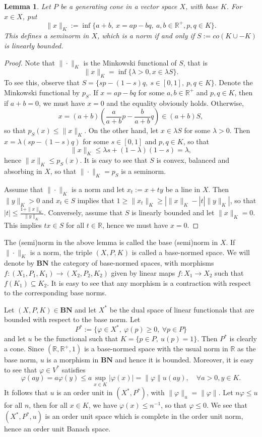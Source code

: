\documentclass[12pt]{article}
\newtheorem{lemma}{Lemma}
\newcommand{\<}{\langle}
\newcommand{\ct}[1]{\mathbf{#1}}
\begin{document}
\begin{lemma} Let $P$ be a  generating cone in a vector space $X$, with base $K$. For $x\in X$, put 
\[
\|x\|_K:=\inf\{a+b,\ x=a p-b q,\ a,b\in \mathbb R^+, p,q\in K\}.
\]
This defines a seminorm in $X$, which is a norm if and only if $S:=co(K\cup -K)$ is linearly bounded. 

\end{lemma}

\begin{proof} Note that $\|\cdot\|_K$ is the Minkowski functional of $S$, that is
\[
\|x\|_K= \inf\{\lambda>0, x\in \lambda S\}.
\]
To see this, observe that $S=\{s p-(1-s)q,\ s\in [0,1],\ p,q\in K\}$. Denote the Minkowski functional by $p_S$. If $x=ap-bq$ for some $a,b\in \mathbb R^+$ and $p,q\in K$, then if $a+b=0$, we must have 
$x=0$ and the equality obviously holds. Otherwise, 
\[
x=(a+b)(\frac a{a+b} p-\frac b{a+b} q)\in (a+b) S,
\]
so that $p_S(x)\le \|x\|_K$. On the other hand, let $x\in \lambda S$ for some $\lambda>0$. Then $x=\lambda(sp-(1-s)q)$ for some $s\in [0,1]$ and $p,q\in K$, so that 
\[
\|x\|_K\le \lambda s+(1-\lambda)(1-s)=\lambda,
\]
hence $\|x\|_K\le p_S(x)$. It is easy to see that $S$ is convex, balanced and absorbing in $X$, so that $\|\cdot\|_K=p_S$ is a seminorm.  

Assume that $\|\cdot\|_K$ is a norm and let $x_t:=x+ty$ be a line in $X$. Then $\|y\|_K>0$ and $x_t\in  S$ implies that $1\ge \|x_t\|_K\ge |\|x\|_K-|t|\|y\|_K|$, so that $|t|\le \tfrac{1+\|x\|_K}{\|y\|_K}$. Conversely, assume that $S$ is linearly bounded and let $\|x\|_K=0$. This implies $tx\in S$ for all $t\in \mathbb R$, hence we must have 
$x=0$. 

\end{proof}

The (semi)norm in the above lemma is called  the base (semi)norm in $X$. If $\|\cdot\|_K$ is a norm, the triple $(X,P,K)$ is called a base-normed space. We will denote 
by $\ct{BN}$ the category of base-normed spaces, with morphisms $f: (X_1,P_1,K_1)\to (X_2,P_2,K_2)$ given by linear maps $f:X_1\to X_2$ such that $f(K_1)\subseteq K_2$. It is easy to see that any morphism is a contraction with respect to the corresponding base norms.

Let $(X,P,K)\in \ct{BN}$ and let $X^*$ be the dual space of linear functionals that are bounded with respect to the base norm. Let 
\[
P^*:=\{ \varphi\in X^*,\ \varphi(p)\ge 0,\ \forall p\in P\}
\]
and let $u$ be the functional such that $K=\{p\in P,\ u(p)=1\}$. Then $P^*$ is clearly a  cone.
Since $(\mathbb R, \mathbb R^+, 1)$ is a base-normed space with the usual norm in $\mathbb R$ as the base norm, $u$ is a morphism in $\ct{BN}$ and hence it is bounded. Moreover, it is easy to see that  $\varphi\in V^*$ satisfies
\[
\varphi(ay)=a\varphi(y)\le a\sup_{x\in K}|\varphi(x)|=\|\varphi\|u(ay),\quad \forall  a>0, y\in K.
\]
It follows that $u$ is an order unit in $(X^*,P^*)$, with $\|\varphi\|_u=\|\varphi\|$. Let $n\varphi\le u$ for all $n$, then for all $x\in K$, we have $\varphi(x)\le n^{-1}$, so that $\varphi\le 0$. We see that $(X^*,P^*,u)$ is an order unit space which is complete in the order unit norm, hence an order unit Banach space.
\end{document}

